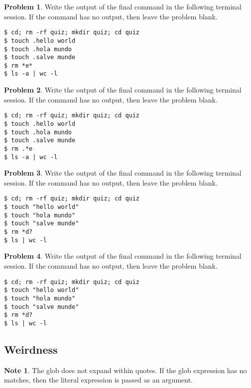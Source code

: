 \documentclass[10pt]{article}
\theoremstyle{definition}
\newtheorem{problem}{Problem}
\newtheorem{note}{Note}
\begin{document}
\filbreak
\begin{problem}
    Write the output of the final command in the following terminal session.
    If the command has no output, then leave the problem blank.
\end{problem}
\begin{lstlisting}
$ cd; rm -rf quiz; mkdir quiz; cd quiz
$ touch .hello world
$ touch .hola mundo 
$ touch .salve munde
$ rm *e*
$ ls -a | wc -l
\end{lstlisting}


\filbreak
\begin{problem}
    Write the output of the final command in the following terminal session.
    If the command has no output, then leave the problem blank.
\end{problem}
\begin{lstlisting}
$ cd; rm -rf quiz; mkdir quiz; cd quiz
$ touch .hello world
$ touch .hola mundo 
$ touch .salve munde
$ rm .*e
$ ls -a | wc -l
\end{lstlisting}
\filbreak
\begin{problem}
    Write the output of the final command in the following terminal session.
    If the command has no output, then leave the problem blank.
\end{problem}
\begin{lstlisting}
$ cd; rm -rf quiz; mkdir quiz; cd quiz
$ touch "hello world"
$ touch "hola mundo"
$ touch "salve munde"
$ rm *d?
$ ls | wc -l
\end{lstlisting}

\filbreak
\begin{problem}
    Write the output of the final command in the following terminal session.
    If the command has no output, then leave the problem blank.
\end{problem}
\begin{lstlisting}
$ cd; rm -rf quiz; mkdir quiz; cd quiz
$ touch "hello world"
$ touch "hola mundo"
$ touch "salve munde"
$ rm *d?
$ ls | wc -l
\end{lstlisting}

\subsection{Weirdness}
\begin{note}
    The glob does not expand within quotes.
    If the glob expression has no matches,
    then the literal expression is passed as an argument.
\end{note}
\end{document}
